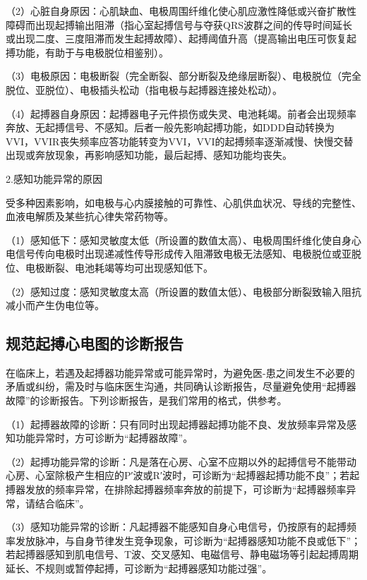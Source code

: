 （2）心脏自身原因：心肌缺血、电极周围纤维化使心肌应激性降低或兴奋扩散性障碍而出现起搏输出阻滞（指心室起搏信号与夺获QRS波群之间的传导时间延长或出现二度、三度阻滞而发生起搏故障）、起搏阈值升高（提高输出电压可恢复起搏功能，有助于与电极脱位相鉴别）。

（3）电极原因：电极断裂（完全断裂、部分断裂及绝缘层断裂）、电极脱位（完全脱位、亚脱位）、电极插头松动（指电极与起搏器连接处松动）。

（4）起搏器自身原因：起搏器电子元件损伤或失灵、电池耗竭。前者会出现频率奔放、无起搏信号、不感知。后者一般先影响起搏功能，如DDD自动转换为VVI，VVIR丧失频率应答功能转变为VVI，VVI的起搏频率逐渐减慢、快慢交替出现或奔放现象，再影响感知功能，最后起搏、感知功能均丧失。

2.感知功能异常的原因

受多种因素影响，如电极与心内膜接触的可靠性、心肌供血状况、导线的完整性、血液电解质及某些抗心律失常药物等。

（1）感知低下：感知灵敏度太低（所设置的数值太高）、电极周围纤维化使自身心电信号传向电极时出现递减性传导形成传入阻滞致电极无法感知、电极脱位或亚脱位、电极断裂、电池耗竭等均可出现感知低下。

（2）感知过度：感知灵敏度太高（所设置的数值太低）、电极部分断裂致输入阻抗减小而产生伪电位等。

\protect\hypertarget{text00045.htmlux5cux23subid509}{}{}

\subsection{规范起搏心电图的诊断报告}

在临床上，若遇及起搏器功能异常或可能异常时，为避免医-患之间发生不必要的矛盾或纠纷，需及时与临床医生沟通，共同确认诊断报告，尽量避免使用“起搏器故障”的诊断报告。下列诊断报告，是我们常用的格式，供参考。

（1）起搏器故障的诊断：只有同时出现起搏器起搏功能不良、发放频率异常及感知功能异常时，方可诊断为“起搏器故障”。

（2）起搏功能异常的诊断：凡是落在心房、心室不应期以外的起搏信号不能带动心房、心室除极产生相应的P′波或R′波时，可诊断为“起搏器起搏功能不良”；若起搏器发放的频率异常，在排除起搏器频率奔放的前提下，可诊断为“起搏器频率异常，请结合临床”。

（3）感知功能异常的诊断：凡起搏器不能感知自身心电信号，仍按原有的起搏频率发放脉冲，与自身节律发生竞争现象，可诊断为“起搏器感知功能不良或低下”；若起搏器感知到肌电信号、T波、交叉感知、电磁信号、静电磁场等引起起搏周期延长、不规则或暂停起搏，可诊断为“起搏器感知功能过强”。

